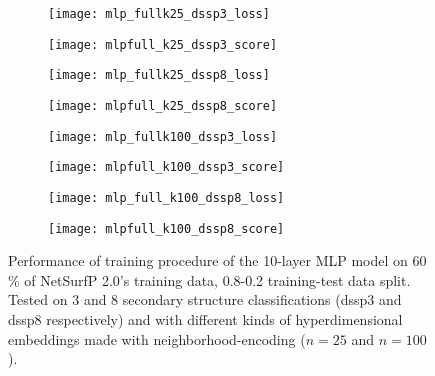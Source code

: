 \begin{figure}[htbp]
    \centering
    \begin{subfigure}{0.48\textwidth}
        \texttt{[image: mlp\_fullk25\_dssp3\_loss]}
        \label{fig:subefig}
    \end{subfigure}
    \hfill
    \begin{subfigure}{0.48\textwidth}
        \texttt{[image: mlpfull\_k25\_dssp3\_score]}
        \label{fig:subefi}
    \end{subfigure}
    
    \begin{subfigure}{0.48\textwidth}
        \texttt{[image: mlp\_fullk25\_dssp8\_loss]}
        \label{fig:subef}
    \end{subfigure}
    \hfill
    \begin{subfigure}{0.48\textwidth}
        \texttt{[image: mlpfull\_k25\_dssp8\_score]}
        \label{fig:sube}
    \end{subfigure}
    
    \begin{subfigure}{0.48\textwidth}
        \texttt{[image: mlp\_fullk100\_dssp3\_loss]}
        \label{fig:sue}
    \end{subfigure}
    \hfill
    \begin{subfigure}{0.48\textwidth}
        \texttt{[image: mlpfull\_k100\_dssp3\_score]}
        \label{fig:se}
    \end{subfigure}
    
    \begin{subfigure}{0.48\textwidth}
        \texttt{[image: mlp\_full\_k100\_dssp8\_loss]}
        \label{fig:sge}
    \end{subfigure}
    \hfill
    \begin{subfigure}{0.48\textwidth}
        \texttt{[image: mlpfull\_k100\_dssp8\_score]}
        \label{fig:she}
    \end{subfigure}
    \caption{Performance of training procedure of the 10-layer MLP model on 60 \% of NetSurfP 2.0's training data, 0.8-0.2 training-test data split. Tested on 3 and 8 secondary structure classifications (dssp3 and dssp8 respectively) and with different kinds of hyperdimensional embeddings made with neighborhood-encoding ($n = 25$ and $n=100$).}
    \label{fig:main8e}
  \end{figure}

